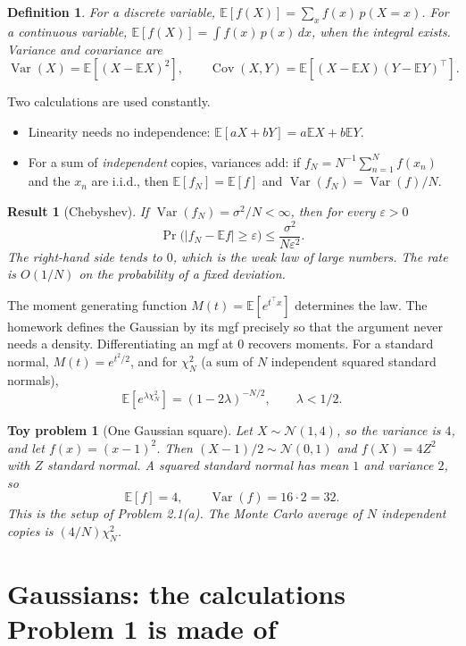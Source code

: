 \documentclass[11pt]{article}
\newtheorem{definition}{Definition}
\newtheorem{result}{Result}
\newtheorem{toy}{Toy problem}
\theoremstyle{remark}
\newcommand{\E}{\mathbb{E}}
\newcommand{\Var}{\operatorname{Var}}
\newcommand{\Cov}{\operatorname{Cov}}
\newcommand{\N}{\mathcal{N}}
\begin{document}
\begin{definition}
For a discrete variable, \(\E[f(X)]=\sum_x f(x)\,p(X=x)\). For a continuous variable, \(\E[f(X)]=\int f(x)\,p(x)\,dx\), when the integral exists. Variance and covariance are
\[
\Var(X)=\E[(X-\E X)^2],\qquad
\Cov(X,Y)=\E[(X-\E X)(Y-\E Y)^\top].
\]
\end{definition}

Two calculations are used constantly.
\begin{itemize}
\item Linearity needs no independence: \(\E[aX+bY]=a\E X+b\E Y\).
\item For a sum of \emph{independent} copies, variances add: if \(f_N=N^{-1}\sum_{n=1}^N f(x_n)\) and the \(x_n\) are i.i.d., then \(\E[f_N]=\E[f]\) and \(\Var(f_N)=\Var(f)/N\).
\end{itemize}

\begin{result}[Chebyshev]
If \(\Var(f_N)=\sigma^2/N<\infty\), then for every \(\varepsilon>0\)
\[
\Pr\big(|f_N-\E f|\ge\varepsilon\big)\le\frac{\sigma^2}{N\varepsilon^2}.
\]
The right-hand side tends to \(0\), which is the weak law of large numbers. The rate is \(O(1/N)\) on the probability of a fixed deviation.
\end{result}

The moment generating function \(M(t)=\E[e^{t^\top x}]\) determines the law. The homework defines the Gaussian by its mgf precisely so that the argument never needs a density. Differentiating an mgf at \(0\) recovers moments. For a standard normal, \(M(t)=e^{t^2/2}\), and for \(\chi^2_N\) (a sum of \(N\) independent squared standard normals),
\[
\E[e^{\lambda\chi^2_N}]=(1-2\lambda)^{-N/2},\qquad\lambda<1/2.
\]

\begin{toy}[One Gaussian square]
Let \(X\sim\N(1,4)\), so the variance is \(4\), and let \(f(x)=(x-1)^2\). Then \((X-1)/2\sim\N(0,1)\) and \(f(X)=4Z^2\) with \(Z\) standard normal. A squared standard normal has mean \(1\) and variance \(2\), so
\[
\E[f]=4,\qquad\Var(f)=16\cdot 2=32.
\]
This is the setup of Problem 2.1(a). The Monte Carlo average of \(N\) independent copies is \((4/N)\chi^2_N\).
\end{toy}

\section{Gaussians: the calculations Problem 1 is made of}
\label{sec:gauss}
\end{document}

